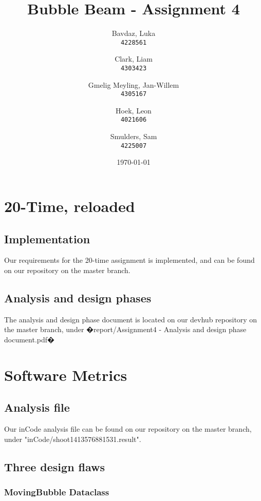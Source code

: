 \documentclass[a4paper]{article}
\title{Bubble Beam - Assignment 4}
\author{
    Bavdaz, Luka\\
    \texttt{4228561}
    \and
    Clark, Liam\\
    \texttt{4303423}
    \and
    Gmelig Meyling, Jan-Willem\\
    \texttt{4305167}
    \and
    Hoek, Leon\\
    \texttt{4021606}
    \and
    Smulders, Sam\\
    \texttt{4225007}
}
\date{\today}
\begin{document}
\maketitle

\section{20-Time, reloaded}

\subsection{Implementation}
Our requirements for the 20-time assignment is implemented, and can be found on our repository on the master branch.
\subsection{Analysis and design phases}

The analysis and design phase document is located on our devhub repository on the master branch, under �report/Assignment4 - Analysis and design phase document.pdf�

\section{Software Metrics}

\subsection{Analysis file}
Our inCode analysis file can be found on our repository on the master branch, under "inCode/shoot\textemdash1413576881531.result".

\subsection{Three design flaws}


\subsubsection{MovingBubble Dataclass}\label{MovingBubble}
\end{document}
